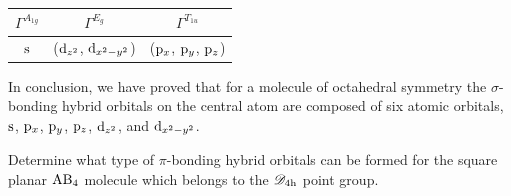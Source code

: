 \documentclass[a4paper]{book}
\newcommand{\orb}[1]{{\rm #1}}
\newcommand{\orbs}{\orb{s}}
\newcommand{\orbp}{\orb{p}}
\newcommand{\orbd}{\orb{d}}
\begin{document}
\begin{solution}
		\begin{center}
		\begin{tabular}{ccc} \hline
		$\Gamma^{A_{1g}}$	&	$\Gamma^{E_g}$	&	$\Gamma^{T_{1u}}$\\	\hline
		$\orbs$	&	($\orbd_{z^2}$, $\orbd_{x^2-y^2}$) & ($\orbp_x$, $\orbp_y$, $\orbp_z$) \\ \hline
		\end{tabular}
		\end{center}
		
		In conclusion, we have proved that for a molecule of octahedral symmetry the $\sigma$-bonding hybrid orbitals on the central atom are composed of six atomic orbitals, $\orbs$, $\orbp_x$, $\orbp_y$, $\orbp_z$, $\orbd_{z^2}$, and $\orbd_{x^2-y^2}$.
		
	\end{solution}
	
	\begin{exercise}
		Determine what type of $\pi$-bonding hybrid orbitals can be formed for the square planar $\ce{AB4}$ molecule which belongs to the $\mathscr{D}_{\rm 4h}$ point group.
	\end{exercise}
	
\end{document}
